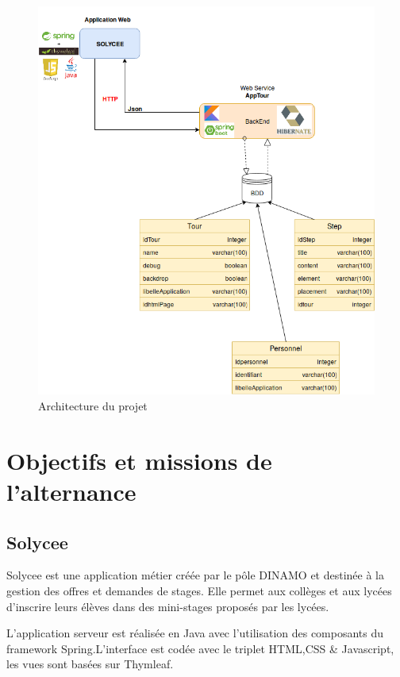 \documentclass[12pt]{article}
\begin{document}
\begin{figure}[H]
	\centering
 		\includegraphics[width=1\textwidth]{diagrammes/ArchitectureGenerale.png}
  		\caption{Architecture du projet}
	\end{figure}


\section{Objectifs et missions de l'alternance}

\subsection{Solycee}

Solycee est une application métier créée par le pôle DINAMO et destinée à la gestion des offres et demandes de stages. Elle permet aux collèges et aux lycées d'inscrire leurs élèves dans des mini-stages proposés par les lycées.  

L'application serveur est réalisée en Java avec l'utilisation des composants du framework Spring.L'interface est codée avec le triplet HTML,CSS \& Javascript, les vues sont basées sur Thymleaf. 
\end{document}
